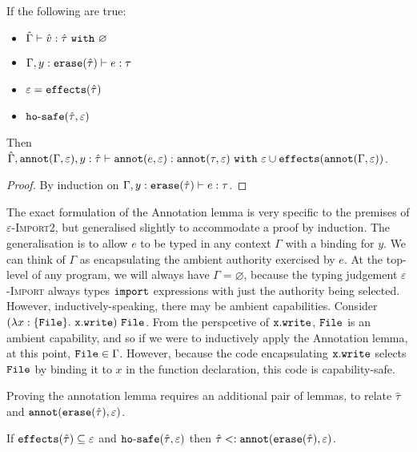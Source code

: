 \begin{lemma}[Annotation]
If the following are true:

\begin{itemize}
	\setlength\itemsep{-0.7em}
	\item $\hat \Gamma \vdash \hat v : \hat \tau~\mathtt{with}~ \varnothing$
	\item $\Gamma, y: \mathtt{erase}(\hat \tau) \vdash e: \tau$
	\item $\varepsilon = \mathtt{effects}(\hat \tau)$
	\item $\mathtt{ho \hbox{-} safe}(\hat \tau, \varepsilon)$
\end{itemize}

\noindent
Then $\hat \Gamma, \mathtt{annot}(\Gamma, \varepsilon), y: \hat \tau \vdash \mathtt{annot}(e, \varepsilon) : \mathtt{annot}(\tau, \varepsilon)~\mathtt{with}~ \varepsilon \cup \mathtt{effects}(\mathtt{annot}(\Gamma, \varepsilon))$.
\end{lemma}

\begin{proof}
By induction on $\Gamma, y: \mathtt{erase}(\hat \tau) \vdash e: \tau$.
\end{proof}

\noindent
The exact formulation of the Annotation lemma is very specific to the premises of \textsc{$\varepsilon$-Import2}, but generalised slightly to accommodate a proof by induction. The generalisation is to allow $e$ to be typed in any context $\Gamma$ with a binding for $y$. We can think of $\Gamma$ as encapsulating the ambient authority exercised by $e$. At the top-level of any program, we will always have $\Gamma = \varnothing$, because the typing judgement \textsc{$\varepsilon$-Import} always types $\mathtt{import}$ expressions with just the authority being selected. However, inductively-speaking, there may be ambient capabilities. Consider $(\lambda x: \{ \mathtt{File} \}.~\mathtt{x.write})~\mathtt{File}$. From the perspcetive of $\mathtt{x.write}$, $\mathtt{File}$ is an ambient capability, and so if we were to inductively apply the Annotation lemma, at this point, $\mathtt{File} \in \Gamma$. However, because the code encapsulating $\mathtt{x.write}$ selects $\mathtt{File}$ by binding it to $x$ in the function declaration, this code is capability-safe.

Proving the annotation lemma requires an additional pair of lemmas, to relate $\hat \tau$ and $\mathtt{annot}(\mathtt{erase}(\hat \tau), \varepsilon)$.

\begin{lemma}
If $\mathtt{effects}(\hat \tau) \subseteq \varepsilon$ and $\mathtt{ho \hbox{-} safe}(\hat \tau, \varepsilon)$ then $\hat \tau <: \mathtt{annot}(\mathtt{erase}(\hat \tau), \varepsilon)$.
\end{lemma}

